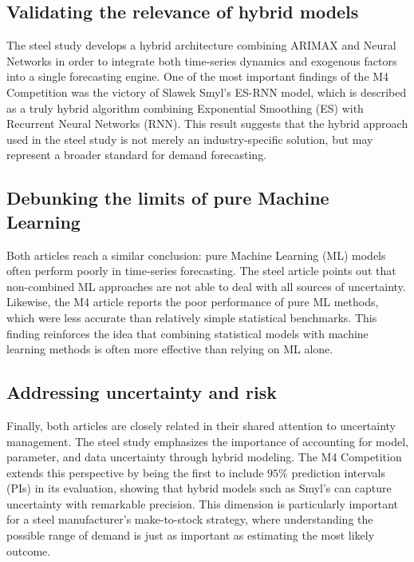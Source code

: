 
\subsection{Validating the relevance of hybrid models}

The steel study develops a hybrid architecture combining ARIMAX and Neural Networks in order to integrate both time-series dynamics and exogenous factors into a single forecasting engine. One of the most important findings of the M4 Competition was the victory of Slawek Smyl's ES-RNN model, which is described as a truly hybrid algorithm combining Exponential Smoothing (ES) with Recurrent Neural Networks (RNN). This result suggests that the hybrid approach used in the steel study is not merely an industry-specific solution, but may represent a broader standard for demand forecasting.

\subsection{Debunking the limits of pure Machine Learning}

Both articles reach a similar conclusion: pure Machine Learning (ML) models often perform poorly in time-series forecasting. The steel article points out that non-combined ML approaches are not able to deal with all sources of uncertainty. Likewise, the M4 article reports the poor performance of pure ML methods, which were less accurate than relatively simple statistical benchmarks. This finding reinforces the idea that combining statistical models with machine learning methods is often more effective than relying on ML alone.

\subsection{Addressing uncertainty and risk}

Finally, both articles are closely related in their shared attention to uncertainty management. The steel study emphasizes the importance of accounting for model, parameter, and data uncertainty through hybrid modeling. The M4 Competition extends this perspective by being the first to include \(95\%\) prediction intervals (PIs) in its evaluation, showing that hybrid models such as Smyl's can capture uncertainty with remarkable precision. This dimension is particularly important for a steel manufacturer's make-to-stock strategy, where understanding the possible range of demand is just as important as estimating the most likely outcome.
